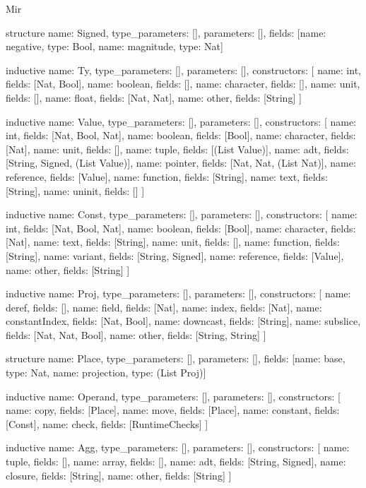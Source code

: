 \begin{lexlean}{Mir}
\begin{semanticmodule}
structure{
  name: Signed,
  type_parameters: [],
  parameters: [],
  fields: [{name: negative, type: Bool}, {name: magnitude, type: Nat}]
}

inductive{
  name: Ty,
  type_parameters: [],
  parameters: [],
  constructors: [
    {name: int, fields: [Nat, Bool]},
    {name: boolean, fields: []},
    {name: character, fields: []},
    {name: unit, fields: []},
    {name: float, fields: [Nat, Nat]},
    {name: other, fields: [String]}
  ]
}

inductive{
  name: Value,
  type_parameters: [],
  parameters: [],
  constructors: [
    {name: int, fields: [Nat, Bool, Nat]},
    {name: boolean, fields: [Bool]},
    {name: character, fields: [Nat]},
    {name: unit, fields: []},
    {name: tuple, fields: [(List Value)]},
    {name: adt, fields: [String, Signed, (List Value)]},
    {name: pointer, fields: [Nat, Nat, (List Nat)]},
    {name: reference, fields: [Value]},
    {name: function, fields: [String]},
    {name: text, fields: [String]},
    {name: uninit, fields: []}
  ]
}

inductive{
  name: Const,
  type_parameters: [],
  parameters: [],
  constructors: [
    {name: int, fields: [Nat, Bool, Nat]},
    {name: boolean, fields: [Bool]},
    {name: character, fields: [Nat]},
    {name: text, fields: [String]},
    {name: unit, fields: []},
    {name: function, fields: [String]},
    {name: variant, fields: [String, Signed]},
    {name: reference, fields: [Value]},
    {name: other, fields: [String]}
  ]
}

inductive{
  name: Proj,
  type_parameters: [],
  parameters: [],
  constructors: [
    {name: deref, fields: []},
    {name: field, fields: [Nat]},
    {name: index, fields: [Nat]},
    {name: constantIndex, fields: [Nat, Bool]},
    {name: downcast, fields: [String]},
    {name: subslice, fields: [Nat, Nat, Bool]},
    {name: other, fields: [String, String]}
  ]
}

structure{
  name: Place,
  type_parameters: [],
  parameters: [],
  fields: [{name: base, type: Nat}, {name: projection, type: (List Proj)}]
}

inductive{
  name: Operand,
  type_parameters: [],
  parameters: [],
  constructors: [
    {name: copy, fields: [Place]},
    {name: move, fields: [Place]},
    {name: constant, fields: [Const]},
    {name: check, fields: [RuntimeChecks]}
  ]
}

inductive{
  name: Agg,
  type_parameters: [],
  parameters: [],
  constructors: [
    {name: tuple, fields: []},
    {name: array, fields: []},
    {name: adt, fields: [String, Signed]},
    {name: closure, fields: [String]},
    {name: other, fields: [String]}
  ]
}


\end{semanticmodule}
\end{lexlean}

